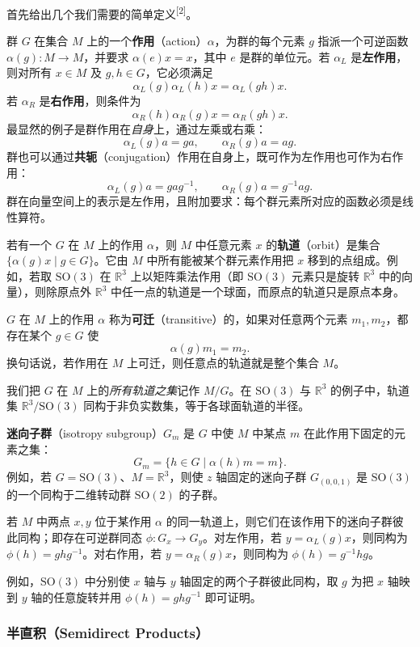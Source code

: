 首先给出几个我们需要的简单定义\textsuperscript{[2]}。

群 $G$ 在集合 $M$ 上的一个\textbf{作用}（action）$\alpha$，为群的每个元素 $g$ 指派一个可逆函数 $\alpha(g):M\to M$，并要求 $\alpha(e)x=x$，其中 $e$ 是群的单位元。若 $\alpha_L$ 是\textbf{左作用}，则对所有 $x\in M$ 及 $g,h\in G$，它必须满足
\[
\alpha_L(g)\alpha_L(h)x=\alpha_L(gh)x .
\]
若 $\alpha_R$ 是\textbf{右作用}，则条件为
\[
\alpha_R(h)\alpha_R(g)x=\alpha_R(gh)x .
\]
最显然的例子是群作用在\emph{自身}上，通过左乘或右乘：
\[
\alpha_L(g)a=ga,\qquad \alpha_R(g)a=ag .
\]
群也可以通过\textbf{共轭}（conjugation）作用在自身上，既可作为左作用也可作为右作用：
\[
\alpha_L(g)a=gag^{-1},\qquad \alpha_R(g)a=g^{-1}ag .
\]
群在向量空间上的表示是左作用，且附加要求：每个群元素所对应的函数必须是线性算符。

若有一个 $G$ 在 $M$ 上的作用 $\alpha$，则 $M$ 中任意元素 $x$ 的\textbf{轨道}（orbit）是集合 $\{\alpha(g)x\mid g\in G\}$。它由 $M$ 中所有能被某个群元素作用把 $x$ 移到的点组成。例如，若取 $\mathrm{SO}(3)$ 在 $\mathbb{R}^3$ 上以矩阵乘法作用（即 $\mathrm{SO}(3)$ 元素只是旋转 $\mathbb{R}^3$ 中的向量），则除原点外 $\mathbb{R}^3$ 中任一点的轨道是一个球面，而原点的轨道只是原点本身。

$G$ 在 $M$ 上的作用 $\alpha$ 称为\textbf{可迁}（transitive）的，如果对任意两个元素 $m_1,m_2$，都存在某个 $g\in G$ 使
\[
\alpha(g)m_1=m_2 .
\]
换句话说，若作用在 $M$ 上可迁，则任意点的轨道就是整个集合 $M$。

我们把 $G$ 在 $M$ 上的\emph{所有轨道之集}记作 $M/G$。在 $\mathrm{SO}(3)$ 与 $\mathbb{R}^3$ 的例子中，轨道集 $\mathbb{R}^3/\mathrm{SO}(3)$ 同构于非负实数集，等于各球面轨道的半径。

\textbf{迷向子群}（isotropy subgroup）$G_m$ 是 $G$ 中使 $M$ 中某点 $m$ 在此作用下固定的元素之集：
\[
G_m=\{h\in G\mid \alpha(h)m=m\}.
\]
例如，若 $G=\mathrm{SO}(3)$、$M=\mathbb{R}^3$，则使 $z$ 轴固定的迷向子群 $G_{(0,0,1)}$ 是 $\mathrm{SO}(3)$ 的一个同构于二维转动群 $\mathrm{SO}(2)$ 的子群。

若 $M$ 中两点 $x,y$ 位于某作用 $\alpha$ 的同一轨道上，则它们在该作用下的迷向子群彼此同构；即存在可逆群同态 $\phi:G_x\to G_y$。对左作用，若 $y=\alpha_L(g)x$，则同构为 $\phi(h)=ghg^{-1}$。对右作用，若 $y=\alpha_R(g)x$，则同构为 $\phi(h)=g^{-1}hg$。

例如，$\mathrm{SO}(3)$ 中分别使 $x$ 轴与 $y$ 轴固定的两个子群彼此同构，取 $g$ 为把 $x$ 轴映到 $y$ 轴的任意旋转并用 $\phi(h)=ghg^{-1}$ 即可证明。

\subsubsection{半直积（Semidirect Products）}

